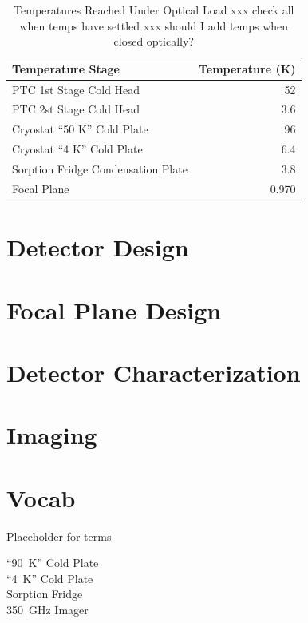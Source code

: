 \documentclass[12pt,article]{memoir} %
\begin{document}
\begin{table}
\centering
\caption{Temperatures Reached Under Optical Load xxx check all when temps have settled xxx should I add temps when closed optically?}
\label{tab:temp-optical-load}
\begin{tabular}{l r}
\toprule
Temperature Stage &  Temperature (K)\\
\midrule
PTC 1st Stage Cold Head 			& 52 \\
PTC 2st Stage Cold Head 			& 3.6 \\
Cryostat ``50 K'' Cold Plate 		& 96 \\
Cryostat ``4 K'' Cold Plate 			& 6.4 \\
Sorption Fridge Condensation Plate 	& 3.8 \\
Focal Plane 						& 0.970 \\
\bottomrule
\end{tabular}
\end{table}

\chapter{Detector Design}\label{c:det-design}

\chapter{Focal Plane Design}\label{c:fp-design}

\chapter{Detector Characterization}\label{c:det-char}

\chapter{Imaging}\label{c:imaging}

\chapter{Vocab}

Placeholder for terms

\begin{description}
\item[``90~K'' Cold Plate] 
\item[``4~K'' Cold Plate] 
\item[Sorption Fridge] 
\item[350~GHz Imager] 

\end{description}
\end{document}
